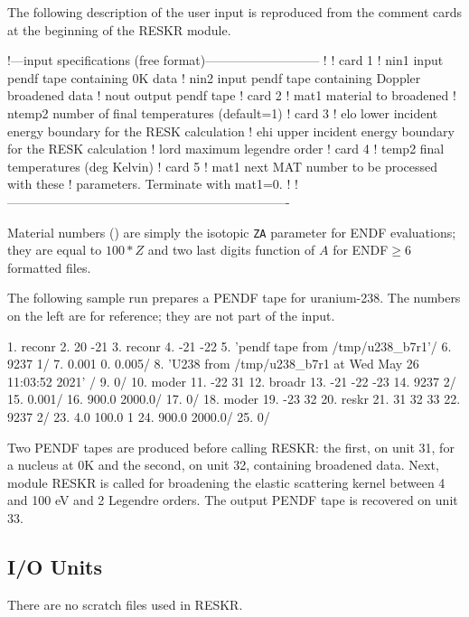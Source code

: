 The following description of the user input is reproduced from
the comment cards at the beginning of the RESKR module.

\small
\begin{ccode}

    !---input specifications (free format)---------------------------
    !
    ! card 1
    !    nin1     input pendf tape containing 0K data
    !    nin2     input pendf tape containing Doppler broadened data
    !    nout     output pendf tape
    ! card 2
    !    mat1     material to broadened
    !    ntemp2   number of final temperatures (default=1)
    ! card 3
    !    elo      lower incident energy boundary for the RESK calculation
    !    ehi      upper incident energy boundary for the RESK calculation
    !    lord     maximum legendre order
    ! card 4
    !    temp2    final temperatures (deg Kelvin)
    ! card 5
    !    mat1     next MAT number to be processed with these
    !             parameters. Terminate with mat1=0.
    !
    !-------------------------------------------------------------------

\end{ccode}
\normalsize

Material numbers () are simply the isotopic {\tt ZA} parameter
for ENDF evaluations; they are equal to $100{*}Z$ and two last digits function
of $A$ for ENDF$\ge$6 formatted files.

The following sample run prepares a PENDF tape for uranium-238.
The numbers on the left are for reference; they are not part of the input.

\small
\begin{ccode}

  1.   reconr
  2.   20 -21
  3.   reconr
  4.   -21 -22
  5.   'pendf tape from /tmp/u238_b7r1'/
  6.   9237 1/
  7.   0.001  0.  0.005/
  8.   'U238 from /tmp/u238_b7r1 at Wed May 26 11:03:52 2021' /
  9.   0/
 10.   moder
 11.   -22 31
 12.   broadr
 13.   -21 -22 -23
 14.   9237 2/
 15.   0.001/
 16.   900.0 2000.0/
 17.   0/
 18.   moder
 19.   -23 32
 20.   reskr
 21.   31 32 33
 22.   9237 2/
 23.   4.0 100.0 1
 24.   900.0 2000.0/
 25.   0/

\end{ccode}
\normalsize

Two PENDF tapes are produced before calling RESKR: the first, on unit 31, for
a nucleus at 0K and the second, on unit 32, containing broadened data. Next,
module RESKR is called for broadening the elastic scattering kernel between
4 and 100 eV and 2 Legendre orders. The output PENDF tape is recovered on unit
33.

\subsection{I/O Units}
\label{ssRESKR_IO}

There are no scratch files used in RESKR.

\cleardoublepage
